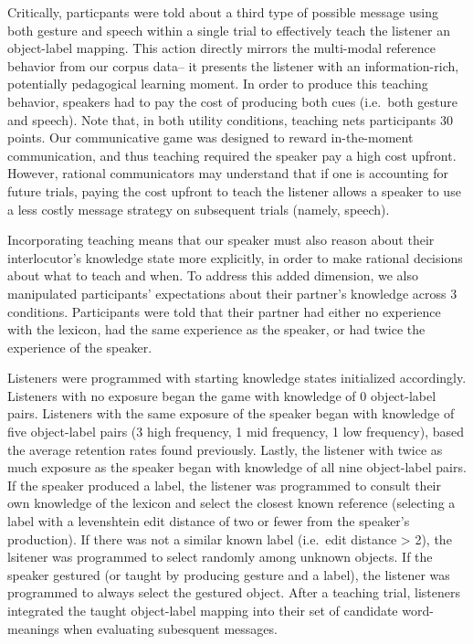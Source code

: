 \documentclass[10pt, letterpaper]{article}
\begin{document}
Critically, particpants were told about a third type of possible message
using both gesture and speech within a single trial to effectively teach
the listener an object-label mapping. This action directly mirrors the
multi-modal reference behavior from our corpus data-- it presents the
listener with an information-rich, potentially pedagogical learning
moment. In order to produce this teaching behavior, speakers had to pay
the cost of producing both cues (i.e.~both gesture and speech). Note
that, in both utility conditions, teaching nets participants 30 points.
Our communicative game was designed to reward in-the-moment
communication, and thus teaching required the speaker pay a high cost
upfront. However, rational communicators may understand that if one is
accounting for future trials, paying the cost upfront to teach the
listener allows a speaker to use a less costly message strategy on
subsequent trials (namely, speech).

Incorporating teaching means that our speaker must also reason about
their interlocutor's knowledge state more explicitly, in order to make
rational decisions about what to teach and when. To address this added
dimension, we also manipulated participants' expectations about their
partner's knowledge across 3 conditions. Participants were told that
their partner had either no experience with the lexicon, had the same
experience as the speaker, or had twice the experience of the speaker.

Listeners were programmed with starting knowledge states initialized
accordingly. Listeners with no exposure began the game with knowledge of
0 object-label pairs. Listeners with the same exposure of the speaker
began with knowledge of five object-label pairs (3 high frequency, 1 mid
frequency, 1 low frequency), based the average retention rates found
previously. Lastly, the listener with twice as much exposure as the
speaker began with knowledge of all nine object-label pairs. If the
speaker produced a label, the listener was programmed to consult their
own knowledge of the lexicon and select the closest known reference
(selecting a label with a levenshtein edit distance of two or fewer from
the speaker's production). If there was not a similar known label
(i.e.~edit distance \textgreater{} 2), the lsitener was programmed to
select randomly among unknown objects. If the speaker gestured (or
taught by producing gesture and a label), the listener was programmed to
always select the gestured object. After a teaching trial, listeners
integrated the taught object-label mapping into their set of candidate
word-meanings when evaluating subesquent messages.
\end{document}
